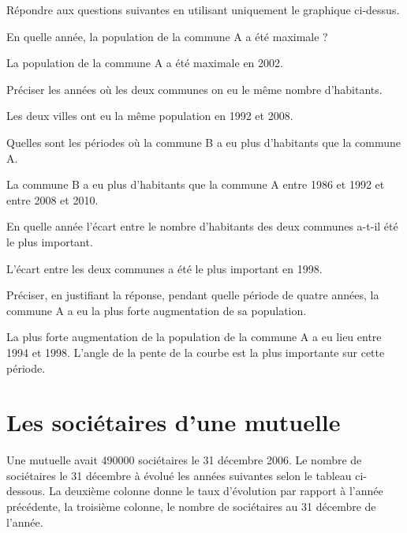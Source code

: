 \documentclass[a4paper,11pt]{exam}
\begin{document}

Répondre aux questions suivantes en utilisant uniquement le graphique ci-dessus.

\begin{questions}
	\question En quelle année, la population de la commune A a été maximale ?
	\begin{solution}
		La population de la commune A a été maximale en 2002.
	\end{solution}
	
	\question Préciser les années où les deux communes on eu le même nombre d'habitants.
	\begin{solution}
		Les deux villes ont eu la même population en 1992 et 2008.
	\end{solution}
	
	\question Quelles sont les périodes où la commune B a eu plus d'habitants que la commune A.
	\begin{solution}
		La commune B a eu plus d'habitants que la commune A entre 1986 et 1992 et entre 2008 et 2010.
	\end{solution}
	
	\question En quelle année l'écart entre le nombre d'habitants des deux communes a-t-il été le plus important.
	\begin{solution}
		L'écart entre les deux communes a été le plus important en 1998.
	\end{solution}
	
	\question Préciser, en justifiant la réponse, pendant quelle période de quatre années, la commune A a eu la plus forte augmentation de sa population.
	\begin{solution}
		La plus forte augmentation de la population de la commune A a eu lieu entre 1994 et 1998. L'angle de la pente de la courbe est la plus importante sur cette période.
	\end{solution}
\end{questions}


\section{Les sociétaires d'une mutuelle}

Une mutuelle avait \num{490000} sociétaires le 31 décembre 2006. Le nombre de sociétaires le 31 décembre à évolué les années suivantes selon le tableau ci-dessous. La deuxième colonne donne le taux d'évolution par rapport à l'année précédente, la troisième colonne, le nombre de sociétaires au 31 décembre de l'année.\\
\end{document}
